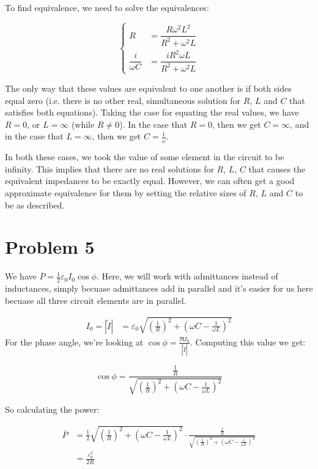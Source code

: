 \documentclass{article}
\theoremstyle{definition}
\numberwithin{equation}{section}
\numberwithin{definition}{section}
\begin{document}
To find equivalence, we need to solve the equivalences: 

\[\begin{cases}
    R &= \dfrac{R \omega^2 L^2}{R^2 + \omega^2 L}\\
    \dfrac{i}{\omega C} &= \dfrac{iR^2\omega L}{R^2 + \omega^2 L}
\end{cases}\]

The only way that these values are equivalent to one another is if both sides equal zero (i.e. there is no other real, simultaneous solution for $R$, $L$ and $C$ that satisfies both equations). Taking the case for equating the real values, we have $R = 0$, or $L = \infty$ (while $R \neq 0$). In the case that $R = 0$, then we get $C = \infty$, and in the case that $L = \infty$, then we get $C = \frac{1}{\omega}$. 

In both these cases, we took the value of some element in the circuit to be infinity. This implies that there are no real solutions for $R$, $L$, $C$ that causes the equivalent impedances to be exactly equal. However, we can often get a good approximate equivalence for them by setting the relative sizes of $R$, $L$ and $C$ to be as described.

\section{Problem 5}

We have $\overline{P} = \frac{1}{2} \varepsilon_0 I_0 \cos \phi$. Here, we will work with admittances instead of inductances, simply becuase admittances add in parallel and it's easier for us here becuase all three circuit elements are in parallel. 

\begin{align*}
    I_0 = \left| \tilde{I}\right| &= \varepsilon_0 \sqrt{\left(\frac{1}{R}\right)^2 + \left(\omega C - \frac{1}{\omega L}\right)^2}
\end{align*}
For the phase angle, we're looking at $\cos \phi = \frac{\Re{I_0}}{|\tilde I|}$. Computing this value we get:

\[ \cos \phi = \frac{\frac{1}{R}}{\sqrt{\left(\frac{1}{R}\right)^2 + \left(\omega C - \frac{1}{\omega L}\right)^2}}\]

So calculating the power:

\begin{align*}
\overline P &= \frac{1}{2}\sqrt{\left(\frac{1}{R}\right)^2 + \left(\omega C - \frac{1}{\omega L}\right)^2} \cdot \frac{\frac{1}{R}}{\sqrt{\left(\frac{1}{R}\right)^2 + \left(\omega C - \frac{1}{\omega L}\right)^2}}\\
&= \frac{\varepsilon_0^2}{2R}
\end{align*}
\end{document}
